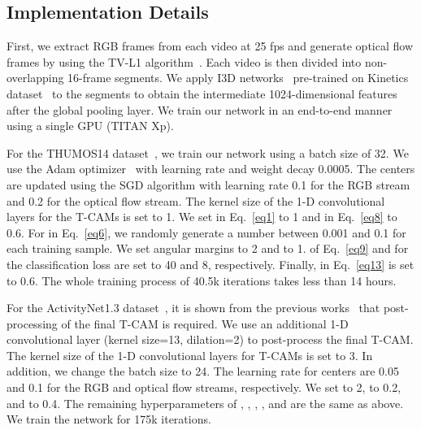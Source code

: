 \documentclass[runningheads]{llncs}
\newcommand{\tcam}{\mbox{T-CAM}}
\newcommand{\thumos}{\mbox{THUMOS14}}
\newcommand{\actthree}{\mbox{ActivityNet1.3}}
\begin{document}
\subsection{Implementation Details}
First, we extract RGB frames from each video at 25 fps and generate optical flow frames by using the TV-L1 algorithm~\cite{zach2007duality}. Each video is then divided into non-overlapping 16-frame segments. We apply I3D networks~\cite{carreira2017quo} pre-trained on Kinetics dataset~\cite{kay2017kinetics} to the segments to obtain the intermediate 1024-dimensional features after the global pooling layer. We train our network in an end-to-end manner using a single GPU (TITAN Xp).

For the \thumos{} dataset~\cite{THUMOS14}, we train our network using a batch size of 32. We use the Adam optimizer~\cite{kingma2014adam} with learning rate  and weight decay 0.0005. The centers are updated using the SGD algorithm with learning rate 0.1 for the RGB stream and 0.2 for the optical flow stream. The kernel size of the 1-D convolutional layers for the \tcam{}s is set to 1. We set  in Eq.~\ref{eq1} to 1 and  in Eq.~\ref{eq8} to 0.6. For  in Eq.~\ref{eq6}, we randomly generate a number between 0.001 and 0.1 for each training sample. We set angular margins  to 2 and  to 1.  of Eq.~\ref{eq9} and  for the classification loss are set to 40 and 8, respectively. Finally,  in Eq.~\ref{eq13} is set to 0.6. The whole training process of 40.5k iterations takes less than 14 hours.

For the \actthree{} dataset~\cite{caba2015activitynet}, it is shown from the previous works~\cite{paul2018w,narayan20193c} that post-processing of the final \tcam{} is required. We use an additional 1-D convolutional layer (kernel size=13, dilation=2) to post-process the final \tcam{}. The kernel size of the 1-D convolutional layers for \tcam{}s is set to 3. In addition, we change the batch size to 24. The learning rate for centers are 0.05 and 0.1 for the RGB and optical flow streams, respectively. We set  to 2,  to 0.2, and  to 0.4. The remaining hyperparameters of , , , , and  are the same as above. We train the network for 175k iterations.
\end{document}
